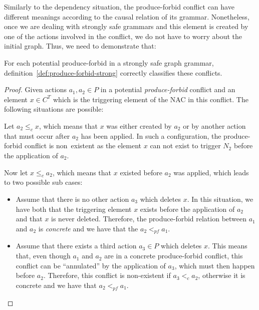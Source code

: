   Similarly to the dependency situation, the produce-forbid conflict can have different meanings according to the causal relation of its grammar. Nonetheless, once we are dealing with strongly safe grammars and this element is created by one of the actions involved in the conflict, we do not have to worry about the initial graph. Thus, we need to demonstrate that:

\begin{thm}  For each potential produce-forbid in a strongly safe graph grammar, definition~\ref{def:produce-forbid-strong} correctly classifies these conflicts.
\end{thm}

\begin{proof} Given actions $a_1,a_2 \in P$ in a potential \emph{produce-forbid} conflict and an element $x \in C^T$ which is the triggering element of the NAC in this conflict. The following situations are possible:
\hfill

\begin{description}[style=nextline,leftmargin=*]
  \item[Triggering element is related to the action:]
    Let $a_2 \leq_c x$, which means that $x$ was  either created by $a_2$ or by another action that must occur after $a_2$ has been applied. In such a configuration, the produce-forbid conflict is \mbox{non existent} as the element $x$ can not exist to trigger $N_2$ before the application of $a_2$.

    Now let $x \leq_c a_2$, which means that $x$ existed before $a_2$ was applied, which leads to two possible sub cases:

    \begin{itemize}
      \item Assume that there is no other action $a_3$ which deletes $x$. In this situation, we have both that the triggering element $x$ exists before the application of $a_2$ and that $x$ is never deleted. Therefore, the produce-forbid relation between $a_1$ and $a_2$ is \emph{concrete} and we have that the $a_2 <_{pf} a_1$.
      \item Assume that there exists a third action $a_3 \in P$ which deletes $x$. This means that, even though $a_1$ and $a_2$ are in a concrete produce-forbid conflict, this conflict can be ``annulated'' by the application of $a_3$, which must then happen before $a_2$. Therefore, this conflict is non-existent if $a_3 <_c a_2$, otherwise it is concrete and we have that $a_2 <_{pf} a_1$.
    \end{itemize}


\end{description}
\end{proof}
